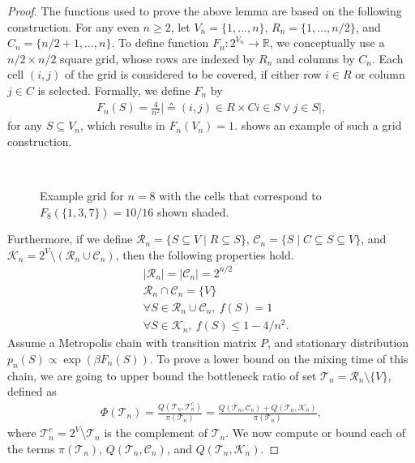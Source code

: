\begin{proof}
The functions used to prove the above lemma are based on the following construction.
For any even $n \geq 2$, let $V_n = \{1,\ldots,n\}$, $R_n = \{1,\ldots,n/2\}$, and $C_n = \{n/2+1,\ldots,n\}$.
To define function $F_n : 2^{V_n} \to \mathbb{R}$, we conceptually use a $n/2 \times n/2$ square grid, whose rows are indexed by $R_n$ and columns by $C_n$.
Each cell $(i, j)$ of the grid is considered to be covered, if either row $i \in R$ or column $j \in C$ is selected.
Formally, we define $F_n$ by
\begin{align*}
  F_n(S) = \frac{4}{n^2}\big\vert \sdef{(i, j) \in R \times C}{i \in S \lor j \in S}\big\vert,
\end{align*}
for any $S \subseteq V_n$, which results in $F_n(V_n) = 1$.
 shows an example of such a grid construction.

\begin{figure}[htb]
  \centering
  \\[1em]
  \caption{Example grid for $n = 8$ with the cells that correspond to $F_8(\{1,3,7\}) = 10/16$ shown shaded.}
  \label{fig:submod_grid}
\end{figure}

\newcommand{\hrn}{\mathcal{R}_n}
\newcommand{\hcn}{\mathcal{C}_n}
\newcommand{\hkn}{\mathcal{K}_n}
\newcommand{\htn}{\mathcal{T}_n}

Furthermore, if we define $\hrn = \{S \subseteq V \mid R \subseteq S\}$, $\hcn = \{S \mid C \subseteq S \subseteq V\}$, and $\hkn = 2^V \setminus (\hrn \cup \hcn)$, then the following properties hold.
\begin{align}
  &|\hrn| = |\hcn| = 2^{n/2} \label{eq:prop1} \\
  &\hrn \cap \hcn = \{V\} \label{eq:prop2} \\
  &\forall S \in \hrn\cup\hcn,\ f(S) = 1 \label{eq:prop3} \\
  &\forall S \in \hkn,\ f(S) \leq 1 - 4/n^2 \label{eq:prop4}.
\end{align}
Assume a Metropolis chain with transition matrix $P$, and stationary distribution $p_n(S) \propto \exp(\beta F_n(S))$.
To prove a lower bound on the mixing time of this chain, we are going to upper bound the bottleneck ratio \citep[Ch. 7]{levin08} of set $\htn = \hrn \setminus \{V\}$, defined as
\begin{align*}
  \Phi(\htn) = \frac{Q(\htn, \htn^c)}{\pi(\htn)} = \frac{Q(\htn, \hcn) + Q(\htn, \hkn)}{\pi(\htn)},
\end{align*}
where $\htn^c = 2^V \setminus \htn$ is the complement of $\htn$. We now compute or bound each of the terms $\pi(\htn)$, $Q(\htn, \hcn)$, and $Q(\htn, \hkn)$.


\end{proof}
